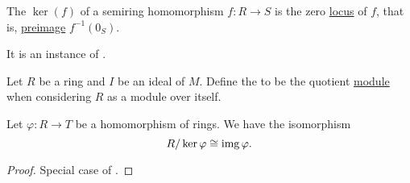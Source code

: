 \begin{definition}\label{def:semiring_kernel}
  The  \( \ker(f) \) of a semiring homomorphism \( f: R \to S \) is the zero \hyperref[def:zero_locus]{locus} of \( f \), that is, \hyperref[def:function/preimage]{preimage} \( f^{-1}(0_S) \).

  It is an instance of .
\end{definition}

\begin{definition}\label{def:quotient_semiring}
  Let \( R \) be a ring and \( I \) be an ideal of \( M \). Define the  to be the quotient \hyperref[def:quotient_left_module]{module} when considering \( R \) as a module over itself.
\end{definition}

\begin{theorem}\label{thm:homomorphism_theorem_for_rings}
  Let \( \varphi: R \to T \) be a homomorphism of rings. We have the isomorphism
  \begin{equation*}
    R / \ker \varphi \cong \operatorname{img} \varphi.
  \end{equation*}
\end{theorem}
\begin{proof}
  Special case of .
\end{proof}

